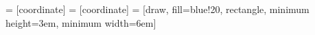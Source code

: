 
 = [coordinate]
 = [coordinate]
 = [draw, fill=blue!20, rectangle, 
	    minimum height=3em, minimum width=6em]

